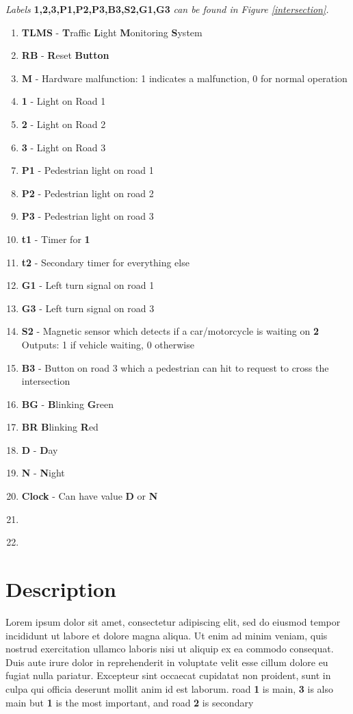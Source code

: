\documentclass[letterpaper]{article}
\begin{document}
\textit{Labels}
\textbf{1,2,3,P1,P2,P3,B3,S2,G1,G3}
\textit{can be found in Figure \ref{intersection}.}
\begin{enumerate}

 \item \textbf{TLMS} -
       \textbf{T}raffic
       \textbf{L}ight
       \textbf{M}onitoring
       \textbf{S}ystem

 \item \textbf{RB} -
       \textbf{R}eset
       \textbf{Button}
 \item \textbf{M} - Hardware malfunction: 1 indicates a malfunction, 0 for normal operation
 \item \textbf{1} - Light on Road 1
 \item \textbf{2} - Light on Road 2
 \item \textbf{3} - Light on Road 3
 \item \textbf{P1} - Pedestrian light on road 1
 \item \textbf{P2} - Pedestrian light on road 2
 \item \textbf{P3} - Pedestrian light on road 3
 \item \textbf{t1} - Timer for \textbf{1}
 \item \textbf{t2} - Secondary timer for everything else
 \item \textbf{G1} - Left turn signal on road 1
 \item \textbf{G3} - Left turn signal on road 3
 \item \textbf{S2} - Magnetic sensor which detects if a car/motorcycle is waiting on \textbf{2}\\
       Outputs: 1 if vehicle waiting, 0 otherwise
 \item \textbf{B3} - Button on road 3 which a pedestrian can hit to request to cross the intersection
 \item \textbf{BG} -
       \textbf{B}linking
       \textbf{G}reen
 \item \textbf{BR}
       \textbf{B}linking
       \textbf{R}ed
 \item \textbf{D} - \textbf{D}ay
 \item \textbf{N} - \textbf{N}ight
 \item \textbf{Clock} - Can have value \textbf{D} or \textbf{N}
 \item \textbf{}
 \item \textbf{}


\end{enumerate}


\section{Description}
Lorem ipsum dolor sit amet, consectetur adipiscing elit, sed do eiusmod tempor
incididunt ut labore et dolore magna aliqua. Ut enim ad minim veniam, quis
nostrud exercitation ullamco laboris nisi ut aliquip ex ea commodo consequat.
Duis aute irure dolor in reprehenderit in voluptate velit esse cillum dolore eu
fugiat nulla pariatur. Excepteur sint occaecat cupidatat non proident, sunt in
culpa qui officia deserunt mollit anim id est laborum.
road \textbf{1} is main, \textbf{3} is also main but \textbf{1} is the most important, and
road \textbf{2} is secondary
\end{document}
